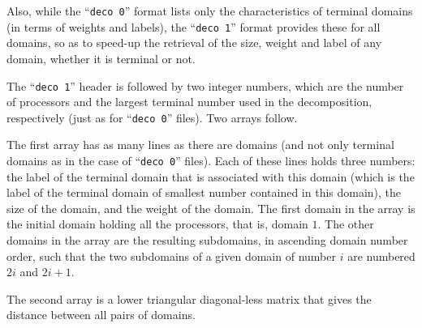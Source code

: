 Also, while the ``\texttt{deco 0}'' format lists only the
characteristics of terminal domains (in terms of weights and labels),
the ``\texttt{deco 1}'' format provides these for all domains, so as
to speed-up the retrieval of the size, weight and label of any domain,
whether it is terminal or not.

The ``\texttt{deco 1}'' header is followed by two integer numbers,
which are the number of processors and the largest terminal number used
in the decomposition, respectively (just as for ``\texttt{deco 0}''
files). Two arrays follow.

The first array has as many lines as there are domains (and not only
terminal domains as in the case of ``\texttt{deco 0}'' files). Each of
these lines holds three numbers: the label of the terminal domain that
is associated with this domain (which is the label of the terminal
domain of smallest number contained in this domain), the size of the
domain, and the weight of the domain.
The first domain in the array is the initial domain holding all the
processors, that is, domain $1$. The other domains in the array are
the resulting subdomains, in ascending domain number order, such that
the two subdomains of a given domain of number $i$ are numbered $2i$
and $2i+1$.

The second array is a lower triangular diagonal-less matrix that gives the
distance between all pairs of domains.

